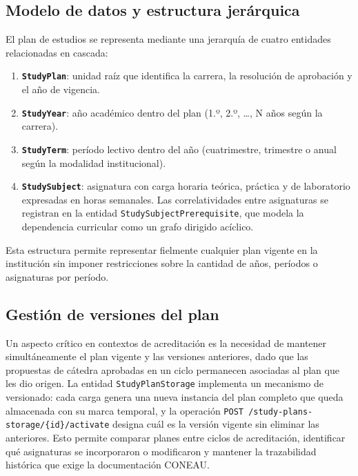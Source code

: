 \subsection{Modelo de datos y estructura jerárquica}
\label{subsec:modelo_plan}

El plan de estudios se representa mediante una jerarquía de cuatro
entidades relacionadas en cascada:

\begin{enumerate}
  \item \textbf{\texttt{StudyPlan}}: unidad raíz que identifica la carrera,
  la resolución de aprobación y el año de vigencia.
  \item \textbf{\texttt{StudyYear}}: año académico dentro del plan
  (1.º, 2.º, \ldots, N años según la carrera).
  \item \textbf{\texttt{StudyTerm}}: período lectivo dentro del año
  (cuatrimestre, trimestre o anual según la modalidad institucional).
  \item \textbf{\texttt{StudySubject}}: asignatura con carga horaria
  teórica, práctica y de laboratorio expresadas en horas semanales.
  Las correlatividades entre asignaturas se registran en la entidad
  \texttt{StudySubjectPrerequisite}, que modela la dependencia curricular
  como un grafo dirigido acíclico.
\end{enumerate}

Esta estructura permite representar fielmente cualquier plan vigente en
la institución sin imponer restricciones sobre la cantidad de años,
períodos o asignaturas por período.

\subsection{Gestión de versiones del plan}
\label{subsec:versiones_plan}

Un aspecto crítico en contextos de acreditación es la necesidad de
mantener simultáneamente el plan vigente y las versiones anteriores,
dado que las propuestas de cátedra aprobadas en un ciclo permanecen
asociadas al plan que les dio origen.
La entidad \texttt{StudyPlanStorage} implementa un mecanismo de
versionado: cada carga genera una nueva instancia del plan completo
que queda almacenada con su marca temporal, y la operación
\texttt{POST /study-plans-storage/\{id\}/activate} designa cuál
es la versión vigente sin eliminar las anteriores.
Esto permite comparar planes entre ciclos de acreditación,
identificar qué asignaturas se incorporaron o modificaron y mantener
la trazabilidad histórica que exige la documentación CONEAU.

